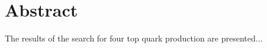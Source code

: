 \label{c:abstract}
\chapter*{Abstract} The results of the search for four top quark production are presented...
